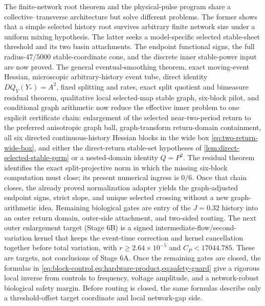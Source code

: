 The finite-network root theorem and the physical-pulse program share a
collective--transverse architecture but solve different problems.  The
former shows that a simple selected history root survives arbitrary finite
network size under a uniform mixing hypothesis.  The latter seeks a
model-specific selected stable-sheet threshold and its two basin attachments.
The endpoint functional signs, the full radius-\(47/5000\)
stable-coordinate cone, and the discrete inner stable-power input are now
proved.  The general eventual-smoothing theorem, exact moving-event Hessian,
microscopic arbitrary-history event tube, direct identity
\(DQ_Y(Y_*)=A^2\), fixed splitting and rates, exact split quotient and
bimeasure residual theorem, qualitative local selected-map stable graph,
six-block pilot, and conditional graph arithmetic now reduce the effective
inner problem to one explicit certificate chain: enlargement of the selected
near-two-period return to the preferred anisotropic graph ball,
graph-transform return-domain containment, all six directed
continuous-history Hessian blocks in the wide box
\cref{eq:two-return-wide-box}, and either the direct-return stable-set
hypotheses of \cref{lem:direct-selected-stable-germ} or a nested-domain
identity \(Q=P^2\).  The residual theorem identifies the exact
split-projective norm in which the missing six-block computation must close;
its present numerical ingress is \(0/6\).  Once that chain closes, the already
proved normalization adapter yields the graph-adjusted endpoint signs, strict
slope, and unique selected crossing without a new graph-arithmetic idea.
Remaining
biological gates are
entry of the \(J=0.32\) history into an outer return domain, outer-side
attachment, and two-sided routing.  The next outer enlargement target
(Stage 6B) is a signed intermediate-flow/second-variation kernel that keeps
the event-time correction and kernel cancellation together before total
variation, with \(r\ge2.64\times10^{-5}\) and
\(C_P<17044.785\).  These are targets, not conclusions of Stage 6A.  Once
the remaining gates are closed, the
formulas in
\cref{eq:block-control,eq:hardware-product,eq:safety-guard} give a rigorous
local inverse from controls to frequency, voltage amplitude, and a
network-robust biological safety margin.  Before routing is closed, the same
formulas describe only a threshold-offset target coordinate and local
network-gap side.

